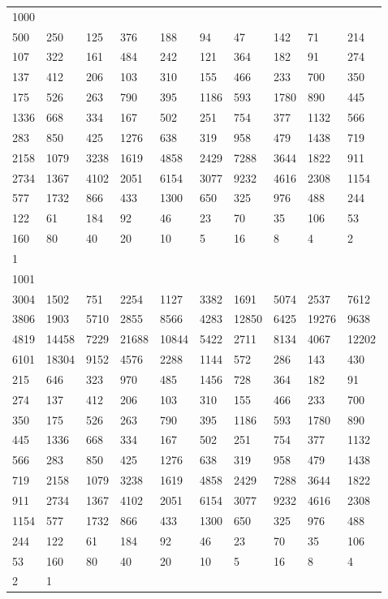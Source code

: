 \begin{longtable}{*{10}{l}}
1000&&&&&&&&&\\
500& 250& 125& 376& 188& 94& 47& 142& 71& 214\\
107& 322& 161& 484& 242& 121& 364& 182& 91& 274\\
137& 412& 206& 103& 310& 155& 466& 233& 700& 350\\
175& 526& 263& 790& 395& 1186& 593& 1780& 890& 445\\
1336& 668& 334& 167& 502& 251& 754& 377& 1132& 566\\
283& 850& 425& 1276& 638& 319& 958& 479& 1438& 719\\
2158& 1079& 3238& 1619& 4858& 2429& 7288& 3644& 1822& 911\\
2734& 1367& 4102& 2051& 6154& 3077& 9232& 4616& 2308& 1154\\
577& 1732& 866& 433& 1300& 650& 325& 976& 488& 244\\
122& 61& 184& 92& 46& 23& 70& 35& 106& 53\\
160& 80& 40& 20& 10& 5& 16& 8& 4& 2\\
1& \\

1001&&&&&&&&&\\
3004& 1502& 751& 2254& 1127& 3382& 1691& 5074& 2537& 7612\\
3806& 1903& 5710& 2855& 8566& 4283& 12850& 6425& 19276& 9638\\
4819& 14458& 7229& 21688& 10844& 5422& 2711& 8134& 4067& 12202\\
6101& 18304& 9152& 4576& 2288& 1144& 572& 286& 143& 430\\
215& 646& 323& 970& 485& 1456& 728& 364& 182& 91\\
274& 137& 412& 206& 103& 310& 155& 466& 233& 700\\
350& 175& 526& 263& 790& 395& 1186& 593& 1780& 890\\
445& 1336& 668& 334& 167& 502& 251& 754& 377& 1132\\
566& 283& 850& 425& 1276& 638& 319& 958& 479& 1438\\
719& 2158& 1079& 3238& 1619& 4858& 2429& 7288& 3644& 1822\\
911& 2734& 1367& 4102& 2051& 6154& 3077& 9232& 4616& 2308\\
1154& 577& 1732& 866& 433& 1300& 650& 325& 976& 488\\
244& 122& 61& 184& 92& 46& 23& 70& 35& 106\\
53& 160& 80& 40& 20& 10& 5& 16& 8& 4\\
2& 1& \\


\end{longtable}

